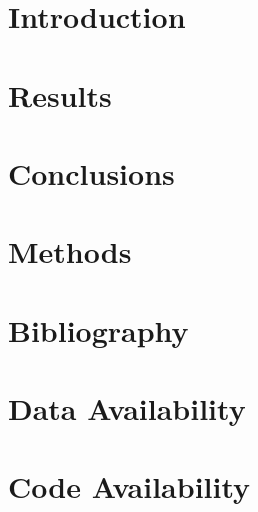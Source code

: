 \documentclass[times, twoside, watermark]{mcphersonlab-biorxiv-style}
\begin{document}



\maketitle
{}

\begin{abstract}

\end {abstract}

\begin{keywords}

\end{keywords}

\section*{Introduction}


\section*{Results}


\section*{Conclusions}




\begin{acknowledgements}





\end{acknowledgements}

\newpage
\newpage
\section*{Methods}





\newpage
\section*{Bibliography}


\newpage
\newpage
\captionsetup*{format=largeformat}

\newpage
\section{Data Availability}


\section{Code Availability}

\end{document}
